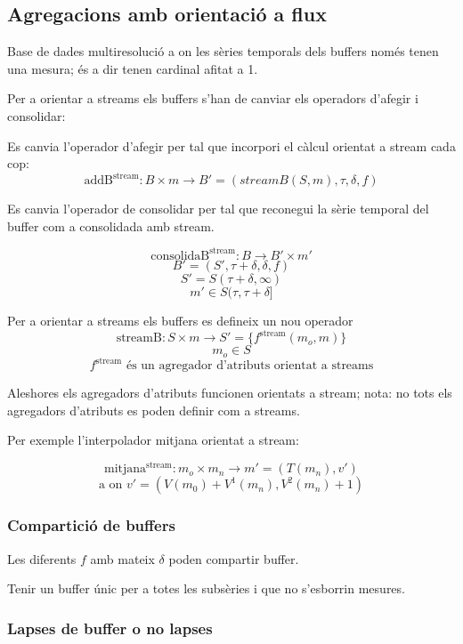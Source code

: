 \subsection{Agregacions amb orientació a flux}



Base de dades multiresolució a on les sèries temporals dels buffers
només tenen una mesura; és a dir tenen cardinal afitat a 1.


Per a orientar a streams els buffers s'han de canviar els operadors
d'afegir i consolidar:

Es canvia l'operador d'afegir per tal que incorpori el càlcul orientat
a stream cada cop:
\[
\text{addB}^{\text{stream}}: B \times m \longrightarrow B' =
(streamB(S,m),\tau,\delta,f)
\]

Es canvia l'operador de consolidar per tal que reconegui la sèrie
temporal del buffer com a consolidada amb stream.

  \[
  \text{consolidaB}^{\text{stream}}: B \longrightarrow B' \times m'
  \]
  \[
  B'= (S',\tau+\delta,\delta,f)
  \]
  \[
  S' = S(\tau+\delta,\infty)
  \]
  \[
  m' \in S(\tau,\tau+\delta] 
  \]


Per a orientar a streams els buffers es defineix un nou operador
\[
\text{streamB}: S \times m \longrightarrow S' = \{f^{\text{stream}}(m_o,m)\}
\]
\[
m_o \in S
\]
\[
f^{\text{stream}} \text{ és un agregador d'atributs orientat a streams}
\]
 

Aleshores els agregadors d'atributs funcionen orientats a stream;
nota: no tots els agregadors d'atributs es poden definir com a
streams.


Per exemple l'interpolador mitjana orientat a stream:

\[
\text{mitjana}^{\text{stream}}: m_o \times m_n \longrightarrow m' = (T(m_n),v')
\]
\[
\text{a on } v' = (V(m_0) + V^1(m_n), V^2(m_n) + 1 )
\]






\subsubsection{Compartició de buffers}


Les diferents $f$ amb mateix $\delta$ poden compartir buffer.


Tenir un buffer únic per a totes les subsèries i que no s'esborrin mesures.






\subsubsection{Lapses de buffer o no lapses}


